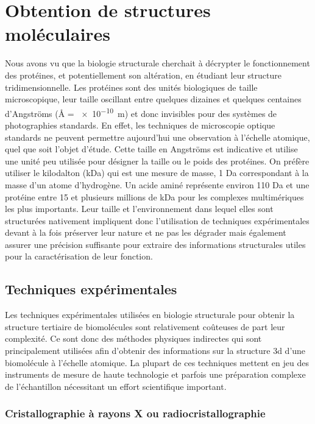 \section{Obtention de structures moléculaires}

Nous avons vu que la biologie structurale cherchait à décrypter le fonctionnement des protéines, et potentiellement son altération, en étudiant leur structure tridimensionnelle. Les protéines sont des unités biologiques de taille microscopique, leur taille oscillant entre quelques dizaines et quelques centaines d'Angströms (\r{A} = \SI{e-10}{\metre}) et donc invisibles pour des systèmes de photographies standards. En effet, les techniques de microscopie optique standards ne peuvent permettre aujourd'hui une observation à l'échelle atomique, quel que soit l'objet d'étude. Cette taille en Angströms est indicative et utilise une unité peu utilisée pour désigner la taille ou le poids des protéines. On préfère utiliser le kilodalton (kDa) qui est une mesure de masse, 1 Da correspondant à la masse d'un atome d'hydrogène. Un acide aminé représente environ 110 Da et une protéine entre 15 et plusieurs millions de kDa pour les complexes multimériques les plus importants. Leur taille et l'environnement dans lequel elles sont structurées nativement impliquent donc l'utilisation de techniques expérimentales devant à la fois préserver leur nature et ne pas les dégrader mais également assurer une précision suffisante pour extraire des informations structurales utiles pour la caractérisation de leur fonction.

\subsection{Techniques expérimentales}

Les techniques expérimentales utilisées en biologie structurale pour obtenir la structure tertiaire de biomolécules sont relativement coûteuses de part leur complexité. Ce sont donc des méthodes physiques indirectes qui sont principalement utilisées afin d'obtenir des informations sur la structure 3d d'une biomolécule à l'échelle atomique. La plupart de ces techniques mettent en jeu des instruments de mesure de haute technologie et parfois une préparation complexe de l'échantillon nécessitant un effort scientifique important.

\subsubsection{Cristallographie à rayons X ou radiocristallographie}

